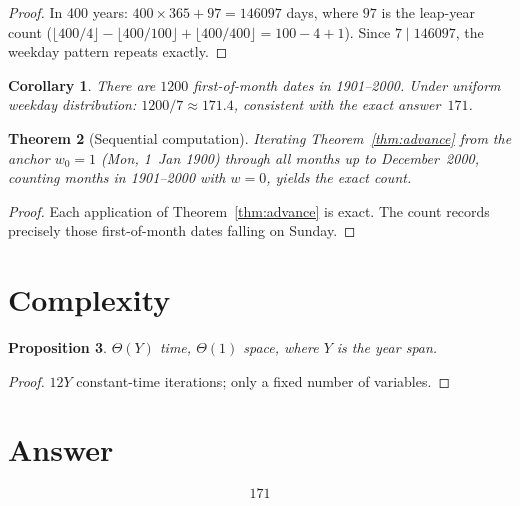\documentclass[12pt,a4paper]{article}
\newtheorem{theorem}{Theorem}
\newtheorem{proposition}[theorem]{Proposition}
\newtheorem{corollary}[theorem]{Corollary}
\theoremstyle{definition}
\begin{document}
\begin{proof}
In 400 years: $400 \times 365 + 97 = 146097$ days, where $97$ is the leap-year count
($\lfloor 400/4 \rfloor - \lfloor 400/100 \rfloor + \lfloor 400/400 \rfloor = 100 - 4 + 1$).
Since $7 \mid 146097$, the weekday pattern repeats exactly.
\end{proof}

\begin{corollary}
There are $1200$ first-of-month dates in 1901--2000. Under uniform weekday distribution:
$1200/7 \approx 171.4$, consistent with the exact answer~$171$.
\end{corollary}

\begin{theorem}[Sequential computation]
Iterating Theorem~\ref{thm:advance} from the anchor $w_0 = 1$ (Mon, 1~Jan 1900) through
all months up to December~2000, counting months in 1901--2000 with $w = 0$, yields the
exact count.
\end{theorem}

\begin{proof}
Each application of Theorem~\ref{thm:advance} is exact. The count records precisely
those first-of-month dates falling on Sunday.
\end{proof}

\section{Complexity}

\begin{proposition}
$\Theta(Y)$ time, $\Theta(1)$ space, where $Y$ is the year span.
\end{proposition}

\begin{proof}
$12Y$ constant-time iterations; only a fixed number of variables.
\end{proof}

\section{Answer}

\[
\boxed{171}
\]
\end{document}
